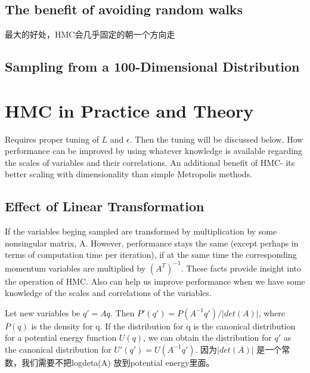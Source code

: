 \documentclass[
]{book}
\theoremstyle{definition}
\theoremstyle{definition}
\theoremstyle{definition}
\theoremstyle{remark}
\begin{document}
\hypertarget{the-benefit-of-avoiding-random-walks}{%
\subsection{The benefit of avoiding random walks}\label{the-benefit-of-avoiding-random-walks}}

最大的好处，HMC会几乎固定的朝一个方向走

\hypertarget{sampling-from-a-100-dimensional-distribution}{%
\subsection{Sampling from a 100-Dimensional Distribution}\label{sampling-from-a-100-dimensional-distribution}}

\hypertarget{hmc-in-practice-and-theory}{%
\section{HMC in Practice and Theory}\label{hmc-in-practice-and-theory}}

Requires proper tuning of \(L\) and \(\epsilon\). Then the tuning will be discussed below. How performance can be improved by using whatever knowledge is available regarding the scales of variables and their correlations. An additional benefit of HMC- its better scaling with dimensionality than simple Metropolis methods.

\hypertarget{effect-of-linear-transformation}{%
\subsection{Effect of Linear Transformation}\label{effect-of-linear-transformation}}

If the variables beging sampled are transformed by multiplication by some nonsingular matrix, A. However, performance stays the same (except perhaps in terms of computation time per iteration), if at the same time the corresponding momentum variables are multiplied by \((A^T)^{-1}\). These facts provide insight into the operation of HMC. Also can help us improve performance when we have some knowledge of the scales and correlations of the variables.

Let new variables be \(q'=Aq\). Then \(P'(q')=P(A^{-1}q')/|det(A)|\), where \(P(q)\) is the density for q. If the distribution for q is the canonical distribution for a potential energy function \(U(q)\), we can obtain the distribution for \(q'\) as the canonical distribution for \(U'(q')=U(A^{-1}q')\). 因为\(|det(A)|\) 是一个常数，我们需要不把log\textbar deta(A)\textbar{} 放到potential energy里面。
\end{document}

